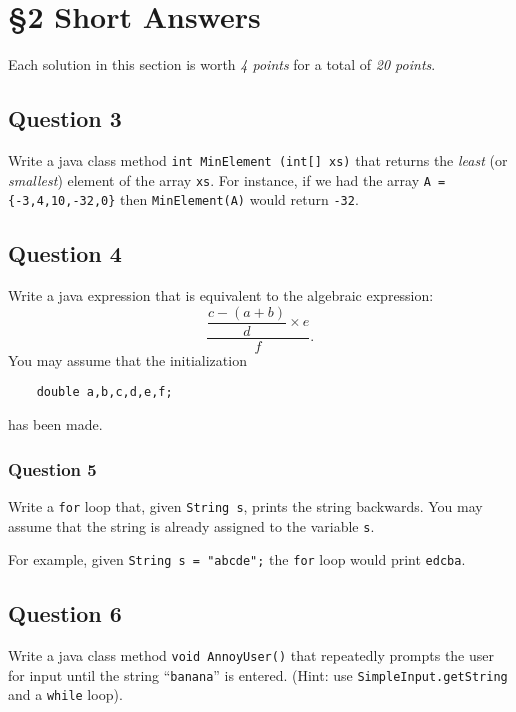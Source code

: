 \clearpage
\section*{\S 2 Short Answers}
Each solution in this section is worth \emph{4 points} for a total of \emph{20 points}.
\vspace{-0.5cm}
\subsection*{Question 3}
Write a java class method \texttt{int MinElement (int[] xs)} that returns the \emph{least} (or \emph{smallest}) element of the array \texttt{xs}. For instance, if we had the array \texttt{A = \{-3,4,10,-32,0\}} then \texttt{MinElement(A)} would return \texttt{-32}. \\

\AnsBox{9cm}
\vspace{-0.5cm}
\subsection*{Question 4}
Write a java expression that is equivalent to the algebraic expression:
$$ \dfrac { \dfrac {c-(a+b)} {d} \times e } {f}.$$
You may assume that the initialization 
\begin{verbatim}
    double a,b,c,d,e,f;
\end{verbatim}
has been made. \\

\AnsBox{2cm}
\clearpage

\subsubsection*{Question 5}
Write a \texttt{for} loop that, given \texttt{String s}, prints the string backwards. You may assume that the string is already assigned to the variable \texttt{s}. 

For example, given \texttt{String s = "abcde";} the \texttt{for} loop would print \texttt{edcba}.\\

\AnsBox{7cm}

\subsection*{Question 6}
Write a java class method \texttt{void AnnoyUser()} that repeatedly prompts the user for input until the string ``\texttt{banana}'' is entered. (Hint: use \texttt{SimpleInput.getString} and a \texttt{while} loop).\\

